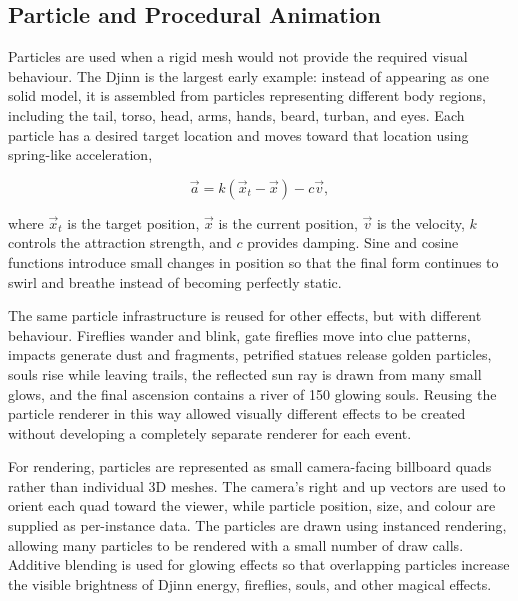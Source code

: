 \documentclass[11pt,a4paper]{article}
\begin{document}
\subsection{Particle and Procedural Animation}

Particles are used when a rigid mesh would not provide the required visual
behaviour. The Djinn is the largest early example: instead of appearing as one
solid model, it is assembled from particles representing different body
regions, including the tail, torso, head, arms, hands, beard, turban, and eyes.
Each particle has a desired target location and moves toward that location using
spring-like acceleration,

\begin{equation}
    \vec{a}
    =
    k(\vec{x}_{t}-\vec{x})-c\vec{v},
\end{equation}

where $\vec{x}_{t}$ is the target position, $\vec{x}$ is the current position,
$\vec{v}$ is the velocity, $k$ controls the attraction strength, and $c$
provides damping. Sine and cosine functions introduce small changes in position
so that the final form continues to swirl and breathe instead of becoming
perfectly static.

The same particle infrastructure is reused for other effects, but with
different behaviour. Fireflies wander and blink, gate fireflies move into clue
patterns, impacts generate dust and fragments, petrified statues release golden
particles, souls rise while leaving trails, the reflected sun ray is drawn from
many small glows, and the final ascension contains a river of 150 glowing
souls. Reusing the particle renderer in this way allowed visually different
effects to be created without developing a completely separate renderer for
each event.

For rendering, particles are represented as small camera-facing billboard
quads rather than individual 3D meshes. The camera's right and up vectors are
used to orient each quad toward the viewer, while particle position, size, and
colour are supplied as per-instance data. The particles are drawn using
instanced rendering, allowing many particles to be rendered with a small
number of draw calls. Additive blending is used for glowing effects so that
overlapping particles increase the visible brightness of Djinn energy,
fireflies, souls, and other magical effects.

\end{document}
